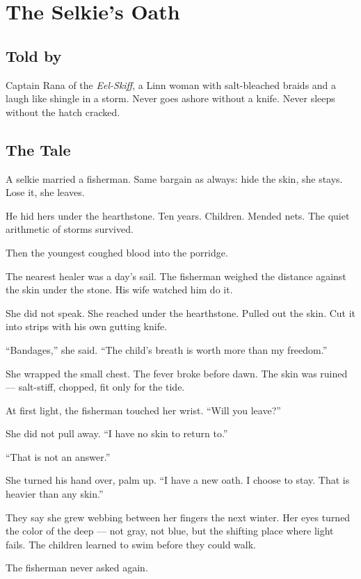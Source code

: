 \chapter{The Selkie's Oath}

\section*{Told by}
Captain Rana of the \textit{Eel-Skiff}, a Linn woman with salt-bleached braids and a laugh like shingle in a storm. Never goes ashore without a knife. Never sleeps without the hatch cracked.

\section*{The Tale}

A selkie married a fisherman. Same bargain as always: hide the skin, she stays. Lose it, she leaves.

He hid hers under the hearthstone. Ten years. Children. Mended nets. The quiet arithmetic of storms survived.

Then the youngest coughed blood into the porridge.

The nearest healer was a day's sail. The fisherman weighed the distance against the skin under the stone. His wife watched him do it.

She did not speak. She reached under the hearthstone. Pulled out the skin. Cut it into strips with his own gutting knife.

``Bandages,'' she said. ``The child's breath is worth more than my freedom.''

She wrapped the small chest. The fever broke before dawn. The skin was ruined --- salt-stiff, chopped, fit only for the tide.

At first light, the fisherman touched her wrist. ``Will you leave?''

She did not pull away. ``I have no skin to return to.''

``That is not an answer.''

She turned his hand over, palm up. ``I have a new oath. I choose to stay. That is heavier than any skin.''

They say she grew webbing between her fingers the next winter. Her eyes turned the color of the deep --- not gray, not blue, but the shifting place where light fails. The children learned to swim before they could walk.

The fisherman never asked again.

